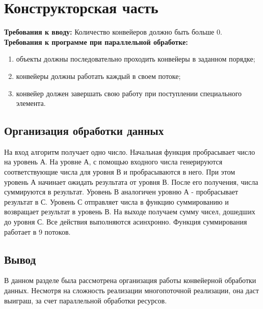 \documentclass[a4paper, 12pt]{article}
\begin{document}
\section{Конструкторская часть}
\begin{flushleft}
	{\bf Требования к вводу: } Количество конвейеров должно быть больше 0.
	\\ {\bf Требования к программе при параллельной обработке: }
	\begin{enumerate}
		\item объекты должны последовательно проходить конвейеры в заданном порядке;
		\item конвейеры должны работать каждый в своем потоке; 
		\item конвейер должен завершать свою работу при поступлении специального элемента.
	\end{enumerate}

	\subsection{Организация обработки данных}
	\hspace*{5mm} На вход алгоритм получает одно число. Начальная функция пробрасывает число на уровень А. На уровне А, с помощью входного числа генерируются соответствующие числа для уровня В и пробрасываются в него. При этом уровень А начинает ожидать результата от уровня В. После его получения, числа суммируются в результат. Уровень В аналогичен уровню А - пробрасывает результат в С. Уровень С отправляет числа в функцию суммированию и возвращает результат в уровень В. На выходе получаем сумму чисел,  дошедших до уровня С. Все действия выполняются асинхронно. Функция суммирования работает в 9 потоков.\cite{geek} 
	
	\subsection{Вывод}
	\hspace*{5mm} В данном разделе была рассмотрена организация работы конвейерной обработки данных. Несмотря на сложность реализации многопоточной реализации, она даст выиграш, за счет параллельной обработки ресурсов. 
\end{flushleft}

\newpage
\end{document}
